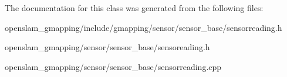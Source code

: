 The documentation for this class was generated from the following files\+:\begin{DoxyCompactItemize}
\item 
openslam\+\_\+gmapping/include/gmapping/sensor/sensor\+\_\+base/sensorreading.\+h\item 
openslam\+\_\+gmapping/sensor/sensor\+\_\+base/sensoreading.\+h\item 
openslam\+\_\+gmapping/sensor/sensor\+\_\+base/sensorreading.\+cpp\end{DoxyCompactItemize}
